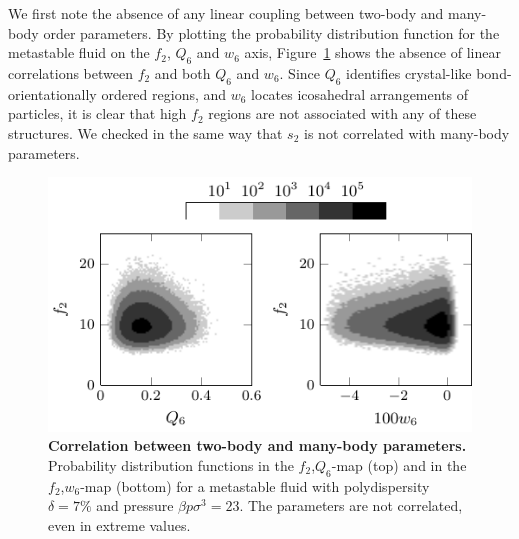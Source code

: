 \documentclass[twocolumn,superscriptaddress]{revtex4-1}
\begin{document}
We first note the absence of any linear coupling between two-body and many-body order parameters.
By plotting the probability distribution function for the metastable fluid on the $f_2$, $Q_6$ and $w_6$ axis, Figure~\ref{fig:f2decoupling} shows the absence of linear correlations between $f_2$ and both $Q_6$ and $w_6$. Since $Q_6$ identifies crystal-like bond-orientationally ordered regions, and $w_6$ locates icosahedral arrangements of particles, it is clear that high $f_2$ regions are not associated with any of these structures. We checked in the same way that $s_2$ is not correlated with many-body parameters.


\begin{figure}
 \centering
 \includegraphics{fig_f2decoupling}
 \caption{\textbf{Correlation between two-body and many-body parameters.} Probability distribution functions in the $f_2$,$Q_6$-map (top) and in the $f_2$,$w_6$-map (bottom) for a metastable fluid with polydispersity $\delta=7\%$ and pressure $\beta p\sigma^3=23$. The parameters are not correlated, even in extreme values.}
 \label{fig:f2decoupling}
\end{figure}
\end{document}

